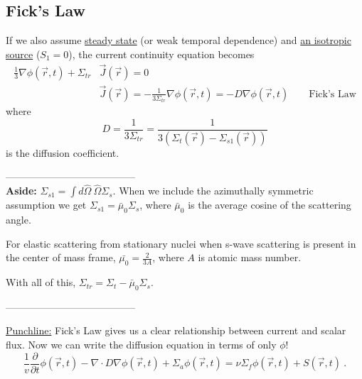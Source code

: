 \documentclass[12pt]{article}
\newlength{\up}
\newcommand{\Macro}{\ensuremath{\Sigma}}
\newcommand{\vOmega}{\ensuremath{\hat{\Omega}}}
\begin{document}
\subsection*{Fick's Law}
If we also assume \underline{steady state} (or weak temporal dependence) and \underline{an isotropic source} ($S_1 = 0$), the current continuity equation becomes
%
\begin{align*}
\frac{1}{3} \nabla \phi(\vec{r}, t) +
\Sigma_{tr}  &\vec{J}(\vec{r}) = 0 \\
&\boxed{\vec{J}(\vec{r}) = -\frac{1}{3\Sigma_{tr}} \nabla \phi(\vec{r}, t) = -D\nabla \phi(\vec{r}, t) } \qquad \text{Fick's Law}
\end{align*}
%
where
\[D = \frac{1}{3\Macro_{tr}} = \frac{1}{3(\Macro_t(\vec{r}) - \Macro_{s1}(\vec{r}))}\] 
is the diffusion coefficient. 

 ---------------------------------------\\
\textbf{Aside:} $\Macro_{s1}  = \int d\vOmega \:\vOmega \Macro_{s}$. When we include the azimuthally symmetric assumption we get $\Macro_{s1} = \bar{\mu}_{0}\Macro_{s}$, where $\bar{\mu}_{0}$ is the average cosine of the scattering angle.

For elastic scattering from stationary nuclei when s-wave scattering is present in the center of mass frame, $\bar{\mu_{0}} = \frac{2}{3A}$, where $A$ is atomic mass number. 

With all of this, $\Sigma_{tr} = \Sigma_t - \bar{\mu}_0 \Sigma_s$.

%
 ---------------------------------------

\underline{Punchline:} Fick's Law gives us a clear relationship between current and scalar flux. Now we can write the diffusion equation in terms of only $\phi$!
%
\begin{equation}
\boxed{\frac{1}{v}\frac{\partial}{\partial t}\phi(\vec{r}, t) 
-\nabla \cdot D\nabla \phi(\vec{r}, t) + 
\Sigma_a \phi(\vec{r}, t) =
\nu \Sigma_f \phi(\vec{r}, t) +
S(\vec{r}, t)} \:. \nonumber
\end{equation}
\end{document}
